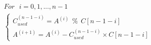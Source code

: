 \documentclass[a4paper]{article}
\begin{document}
\begin{flushleft}
\begin{Large}
\begin{align*}
&For ~~~ i = 0, 1, ..., n-1\\
&\begin{cases}
C_{used}^{(n-1-i)} = A^{(i)} ~~ \% ~~ C[n-1-i] \\
A^{(i+1)} = A^{(i)} - C_{used}^{(n-1-i)} \times C[n-1-i]
\end{cases}
\end{align*}
\end{Large}
\end{flushleft}
\end{document}
